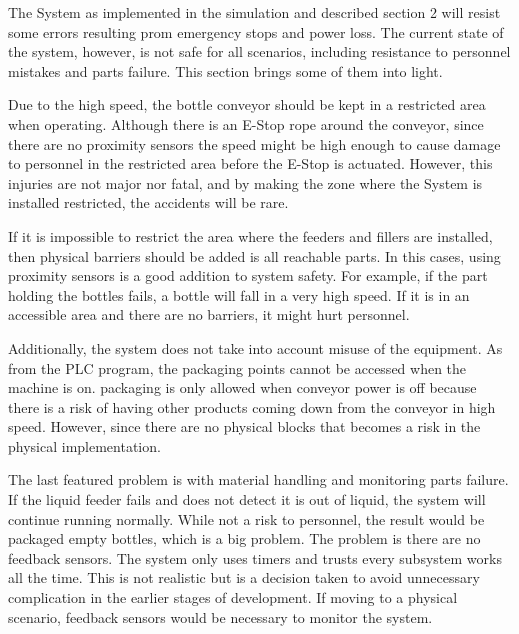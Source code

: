 The System as implemented in the simulation and described section 2 will resist some errors resulting prom emergency stops and power loss. The current state of the system, however, is not safe for all scenarios, including resistance to personnel mistakes and parts failure. This section brings some of them into light.

Due to the high speed, the bottle conveyor should be kept in a restricted area when operating. Although there is an E-Stop rope around the conveyor, since there are no proximity sensors the speed might be high enough to cause damage to personnel in the restricted area before the E-Stop is actuated. However, this injuries are not major nor fatal, and by making the zone where the System is installed restricted, the accidents will be rare.

If it is impossible to restrict the area where the feeders and fillers are installed, then physical barriers should be added is all reachable parts. In this cases, using proximity sensors is a good addition to system safety. For example, if the part holding the bottles fails, a bottle will fall in a very high speed. If it is in an accessible area and there are no barriers, it might hurt personnel.

Additionally, the system does not take into account misuse of the equipment. As from the PLC program, the packaging points cannot be accessed when the machine is on. packaging is only allowed when conveyor power is off because there is a risk of having other products coming down from the conveyor in high speed. However, since there are no physical blocks that becomes a risk in the physical implementation.

The last featured problem is with material handling and monitoring parts failure. If the liquid feeder fails and does not detect it is out of liquid, the system will continue running normally. While not a risk to personnel, the result would be packaged empty bottles, which is a big problem. The problem is there are no feedback sensors. The system only uses timers and trusts every subsystem works all the time. This is not realistic but is a decision taken to avoid unnecessary complication in the earlier stages of development. If moving to a physical scenario, feedback sensors would be necessary to monitor the system.